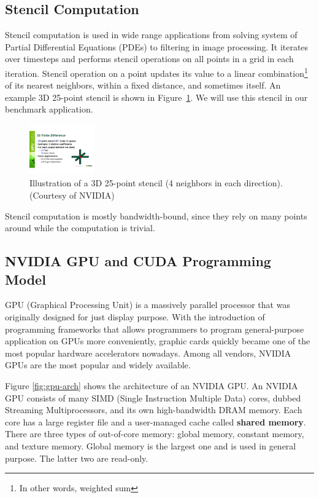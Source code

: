\subsection{Stencil Computation}
Stencil computation is used in wide range applications from solving system of Partial Differential Equations (PDEs) to filtering in image processing. It iterates over timesteps and performs stencil operations on all points in a grid in each iteration. Stencil operation on a point updates its value to a linear combination\footnote{In other words, weighted sum} of its nearest neighbors, within a fixed distance, and sometimes itself. An example 3D 25-point stencil is shown in Figure~\ref{fig:25-point_stencil}. We will use this stencil in our benchmark application.

\begin{figure}[!t]
\centering
\includegraphics[width=0.25\textwidth]{./images/25-point-stencil.pdf}
\caption{Illustration of a 3D 25-point stencil (4 neighbors in each direction). (Courtesy of NVIDIA)}
\label{fig:25-point_stencil}
\end{figure}

Stencil computation is mostly bandwidth-bound, since they rely on many points around while the computation is trivial.

\subsection{NVIDIA GPU and CUDA Programming Model}
GPU (Graphical Processing Unit) is a massively parallel processor that was originally designed for just display purpose. With the introduction of programming frameworks that allows programmers to program general-purpose application on GPUs more conveniently, graphic cards quickly became one of the most popular hardware accelerators nowadays. Among all vendors, NVIDIA GPUs are the most popular and widely available.

Figure \ref{fig:gpu-arch} shows the architecture of an NVIDIA GPU. An NVIDIA GPU consists of many SIMD (Single Instruction Multiple Data) cores, dubbed Streaming Multiprocessors, and its own high-bandwidth DRAM memory. Each core has a large register file and a user-managed cache called \textbf{shared memory}. There are three types of out-of-core memory: global memory, constant memory, and texture memory. Global memory is the largest one and is used in general purpose. The latter two are read-only.

